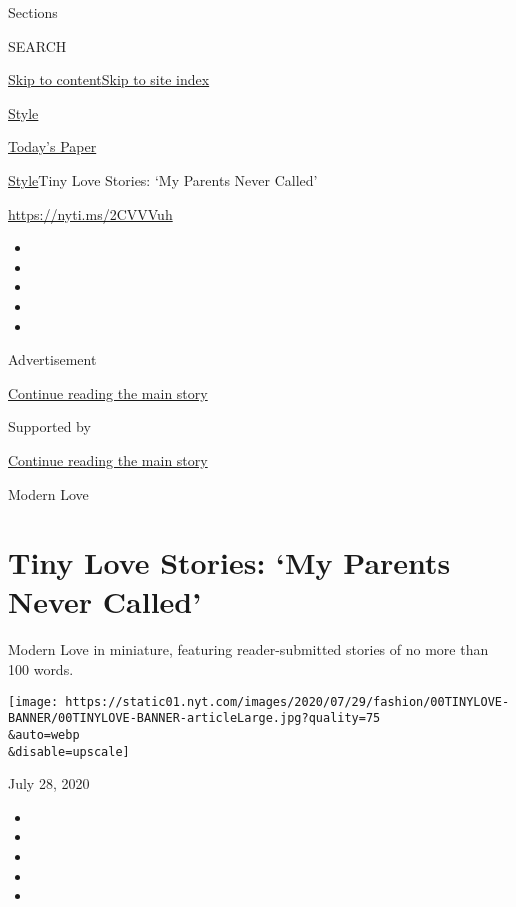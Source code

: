 Sections

SEARCH

\protect\hyperlink{site-content}{Skip to
content}\protect\hyperlink{site-index}{Skip to site index}

\href{https://www.nytimes.com/section/style}{Style}

\href{https://myaccount.nytimes.com/auth/login?response_type=cookie\&client_id=vi}{}

\href{https://www.nytimes.com/section/todayspaper}{Today's Paper}

\href{/section/style}{Style}\textbar{}Tiny Love Stories: `My Parents
Never Called'

\url{https://nyti.ms/2CVVVuh}

\begin{itemize}
\item
\item
\item
\item
\item
\end{itemize}

Advertisement

\protect\hyperlink{after-top}{Continue reading the main story}

Supported by

\protect\hyperlink{after-sponsor}{Continue reading the main story}

Modern Love

\hypertarget{tiny-love-stories-my-parents-never-called}{%
\section{Tiny Love Stories: `My Parents Never
Called'}\label{tiny-love-stories-my-parents-never-called}}

Modern Love in miniature, featuring reader-submitted stories of no more
than 100 words.

\texttt{[image: https://static01.nyt.com/images/2020/07/29/fashion/00TINYLOVE-BANNER/00TINYLOVE-BANNER-articleLarge.jpg?quality=75\\\&auto=webp\\\&disable=upscale]}

July 28, 2020

\begin{itemize}
\item
\item
\item
\item
\item
\end{itemize}

